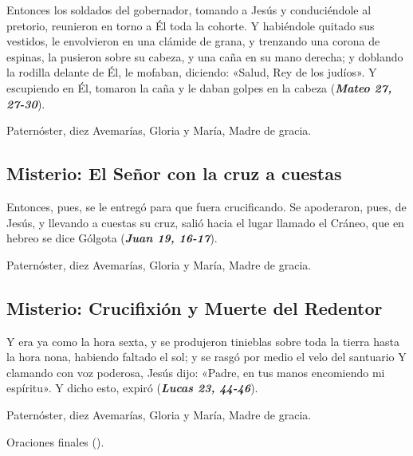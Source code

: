 \documentclass[./main.tex]{subfiles}
\newcounter{sorrowful-counter}
\begin{document}
Entonces los soldados del gobernador, tomando a Jesús y conduciéndole al pretorio,
reunieron en torno a Él toda la cohorte. Y habiéndole quitado sus vestidos, le envolvieron en una clámide de grana,
y trenzando una corona de espinas, la pusieron sobre su cabeza, y una caña en su mano derecha;
y doblando la rodilla delante de Él, le mofaban, diciendo: «Salud, Rey de los judíos».
Y escupiendo en Él, tomaron la caña y le daban golpes en la cabeza (\textbf{\emph{Mateo 27, 27-30}}).

\begin{center}
      Paternóster, diez Avemarías, Gloria y María, Madre de gracia.
\end{center}

\subsection*{ Misterio: El Señor con la cruz a cuestas}

Entonces, pues, se le entregó para que fuera crucificando. Se apoderaron, pues, de Jesús,
y llevando a cuestas su cruz, salió hacia el lugar llamado el Cráneo, que en hebreo se dice Gólgota (\textbf{\emph{Juan 19, 16-17}}).

\begin{center}
      Paternóster, diez Avemarías, Gloria y María, Madre de gracia.
\end{center}

\subsection*{ Misterio: Crucifixión y Muerte del Redentor}

Y era ya como la hora sexta, y se produjeron tinieblas sobre toda la tierra hasta la hora nona,
habiendo faltado el sol; y se rasgó por medio el velo del santuario Y clamando con voz poderosa,
Jesús dijo: «Padre, en tus manos encomiendo mi espíritu». Y dicho esto, expiró (\textbf{\emph{Lucas 23, 44-46}}).

\begin{center}
      Paternóster, diez Avemarías, Gloria y María, Madre de gracia.
      
      Oraciones finales ().
\end{center}
\end{document}
